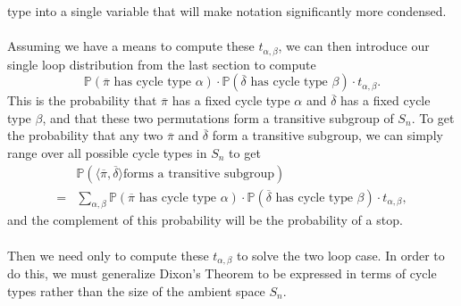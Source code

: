 type into a single variable that will make notation significantly
more condensed.
\\\\Assuming we have a means to compute these $t_{\alpha, \beta}$, we
can then introduce our single loop distribution from the last section to compute
\[
  \mathbb{P}(\overline\pi\text{ has cycle type
  }\alpha)\cdot\mathbb{P}(\overline\delta\text{ has cycle type
  }\beta)\cdot t_{\alpha, \beta}.
\]
This is the probability that $\overline\pi$ has a fixed cycle type
$\alpha$ and $\overline\delta$ has a fixed cycle type $\beta$, and
that these two permutations form a transitive subgroup of $S_n$. To get the
probability that any two $\overline\pi$ and $\overline\delta$ form a
transitive subgroup, we can simply range over all possible cycle
types in $S_n$ to get
\begin{align*}
  & \mathbb{P}(\langle \overline\pi,\overline\delta \rangle\text{
  forms a transitive subgroup})
  \\= &\sum_{\alpha, \beta}\mathbb{P}(\overline\pi\text{ has cycle
  type }\alpha)\cdot\mathbb{P}(\overline\delta\text{ has cycle type
  }\beta)\cdot t_{\alpha, \beta},
\end{align*}
and the complement of this probability will be the probability of a stop.
\\\\Then we need only to compute these $t_{\alpha, \beta}$ to solve
the two loop case. In order to do this, we must generalize Dixon's
Theorem to be expressed in terms of cycle types rather than the size
of the ambient space $S_n$.
